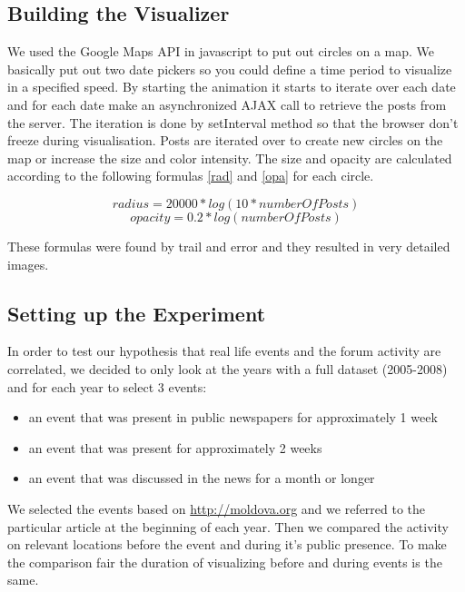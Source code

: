 \documentclass[11pt,a4paper,english]{article}
\begin{document}
		\subsection{Building the Visualizer}
		We used the Google Maps API in javascript to put out circles on a map. We basically put out two date pickers so you could define a time period to visualize in a specified speed. By starting the animation it starts to iterate over each date and for each date make an asynchronized AJAX call to retrieve the posts from the server. The iteration is done by setInterval method so that the browser don't freeze during visualisation. Posts are iterated over to create new circles on the map or increase the size and color intensity. The size and opacity are calculated according to the following formulas \ref{rad} and \ref{opa} for each circle.

		\begin{equation} \label{rad}
			 radius = 20000*log(10* number Of Posts)
		\end{equation}
		\begin{equation} \label{opa}
			 opacity = 0.2*log( number Of Posts )
		\end{equation}

		These formulas were found by trail and error and they resulted in very detailed images.
		
		\subsection{Setting up the Experiment}
		In order to test our hypothesis that real life events and the forum activity are correlated, we decided to only look at the years with a full dataset (2005-2008) and for each year to select 3 events:
		\begin{itemize}
			\item an event that was present in public newspapers for approximately 1 week
			\item an event that was present for approximately 2 weeks
			\item an event that was discussed in the news for a month or longer
		\end{itemize}
		We selected the events based on \url{http://moldova.org} and we referred to the particular article at the beginning of each year. Then we compared the activity on relevant locations before the event and during it's public presence. To make the comparison fair the duration of visualizing before and during events is the same.
\end{document}
